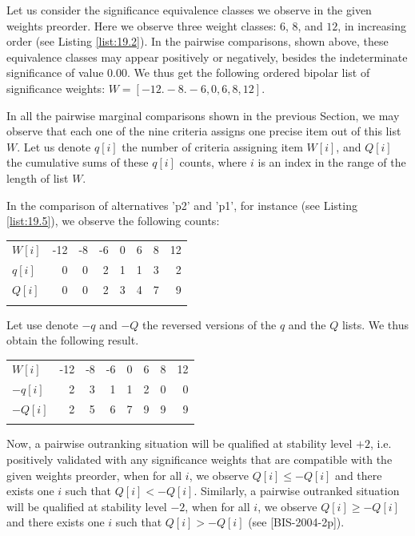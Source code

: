 Let us consider the significance equivalence classes we observe in the given weights preorder. Here we observe three weight classes: $6$, $8$, and $12$, in increasing order (see Listing \ref{list:19.2}). In the pairwise comparisons, shown above, these equivalence classes may appear positively or negatively, besides the indeterminate significance of value $0.00$. We thus get the following ordered bipolar list of significance weights: $W = [-12. -8. -6, 0, 6, 8, 12]$.

In all the pairwise marginal comparisons shown in the previous Section, we may observe that each one of the nine criteria assigns one precise item out of this list $W$. Let us denote $q[i]$ the number of criteria assigning item $W[i]$, and $Q[i]$ the cumulative sums of these $q[i]$ counts, where $i$ is an index in the range of the length of list $W$.

In the comparison of alternatives 'p2' and 'p1', for instance (see Listing \ref{list:19.5}), we observe the following counts: \hfill
\begin{center}
\begin{tabular}{l|r|r|r|r|r|r|r}
 \hline\noalign{\smallskip}
  $W[i]$ & -12 & -8  & -6  &  0  &  6  &  8 &  12\\  
 \noalign{\smallskip}\hline\noalign{\smallskip}
$q[i]$  &  0 &  0 &   2 &   1  &  1  &  3  &  2 \\
$Q[i]$  &  0 &  0 &   2 &   3  &  4  &  7  &  9 \\
      \noalign{\smallskip}\hline
\end{tabular}
\end{center}

\noindent Let use denote $-q$ and $-Q$ the reversed versions of the $q$ and the $Q$ lists. We thus obtain the following result.\hfill
\begin{center}
\begin{tabular}{l|r|r|r|r|r|r|r}
 \hline\noalign{\smallskip}
  $W[i]$ & -12 & -8  & -6  &  0  &  6  &  8 &  12\\  
 \noalign{\smallskip}\hline\noalign{\smallskip}
  $-q[i]$  &  2 &  3 &   1 &   1  &  2  &  0  &  0 \\
  $-Q[i]$  &  2 &  5 &   6 &   7  &  9  &  9  &  9 \\
 \noalign{\smallskip}\hline
\end{tabular}
\end{center}

Now, a pairwise outranking situation will be qualified at stability level $+2$, i.e. positively validated with any significance weights that are compatible with the given weights preorder, when for all $i$, we observe $Q[i] \leq -Q[i]$ and there exists one $i$ such that $Q[i] < -Q[i]$. Similarly, a pairwise outranked situation will be qualified at stability level $-2$, when for all $i$, we observe $Q[i] \geq -Q[i]$ and there exists one $i$ such that $Q[i] > -Q[i]$ (see [BIS-2004-2p]).

